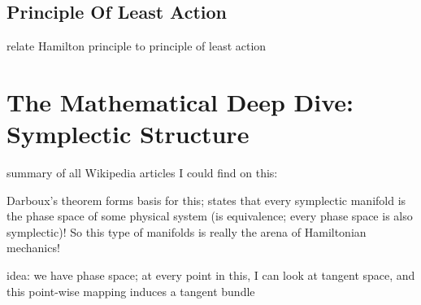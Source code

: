\documentclass[../class_mech_main.tex]{subfiles}
\begin{document}





		\subsection{Principle Of Least Action}
relate Hamilton principle to principle of least action



	\section{The Mathematical Deep Dive: Symplectic Structure}

summary of all Wikipedia articles I could find on this:

Darboux's theorem forms basis for this; states that every symplectic manifold is the phase space of some physical system (is equivalence; every phase space is also symplectic)! So this type of manifolds is really the arena of Hamiltonian mechanics!


idea: we have phase space; at every point in this, I can look at tangent space, and this point-wise mapping induces a tangent bundle
\end{document}
